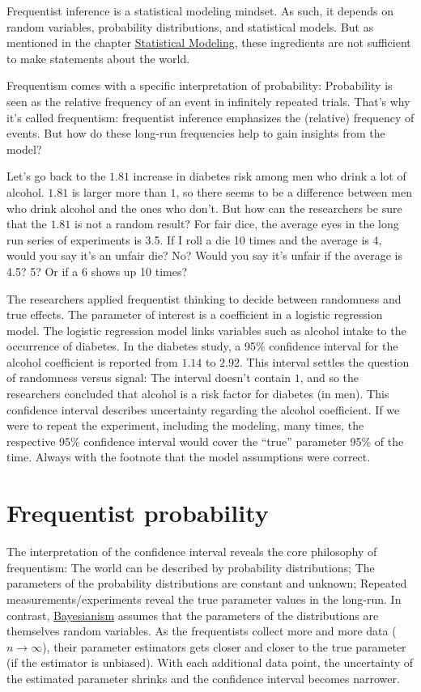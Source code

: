 \documentclass[
  10pt,
]{scrbook}
\begin{document}
Frequentist inference is a statistical modeling mindset.
As such, it depends on random variables, probability distributions, and statistical models.
But as mentioned in the chapter \protect\hyperlink{statistical-modeling}{Statistical Modeling}, these ingredients are not sufficient to make statements about the world.

Frequentism comes with a specific interpretation of probability:
Probability is seen as the relative frequency of an event in infinitely repeated trials.
That's why it's called frequentism: frequentist inference emphasizes the (relative) frequency of events.
But how do these long-run frequencies help to gain insights from the model?

Let's go back to the \(1.81\) increase in diabetes risk among men who drink a lot of alcohol.
\(1.81\) is larger more than \(1\), so there seems to be a difference between men who drink alcohol and the ones who don't.
But how can the researchers be sure that the \(1.81\) is not a random result?
For fair dice, the average eyes in the long run series of experiments is 3.5.
If I roll a die 10 times and the average is 4, would you say it's an unfair die?
No? Would you say it's unfair if the average is 4.5? 5? Or if a 6 shows up 10 times?

The researchers applied frequentist thinking to decide between randomness and true effects.
The parameter of interest is a coefficient in a logistic regression model.
The logistic regression model links variables such as alcohol intake to the occurrence of diabetes.
In the diabetes study, a 95\% confidence interval for the alcohol coefficient is reported from \(1.14\) to \(2.92\).
This interval settles the question of randomness versus signal:
The interval doesn't contain \(1\), and so the researchers concluded that alcohol is a risk factor for diabetes (in men).
This confidence interval describes uncertainty regarding the alcohol coefficient.
If we were to repeat the experiment, including the modeling, many times, the respective 95\% confidence interval would cover the ``true'' parameter 95\% of the time.
Always with the footnote that the model assumptions were correct.

\hypertarget{frequentist-probability}{%
\section{Frequentist probability}\label{frequentist-probability}}

The interpretation of the confidence interval reveals the core philosophy of frequentism:
The world can be described by probability distributions;
The parameters of the probability distributions are constant and unknown;
Repeated measurements/experiments reveal the true parameter values in the long-run.
In contrast, \protect\hyperlink{bayesian}{Bayesianism} assumes that the parameters of the distributions are themselves random variables.
As the frequentists collect more and more data (\(n \to \infty\)), their parameter estimators gets closer and closer to the true parameter (if the estimator is unbiased).
With each additional data point, the uncertainty of the estimated parameter shrinks and the confidence interval becomes narrower.
\end{document}
